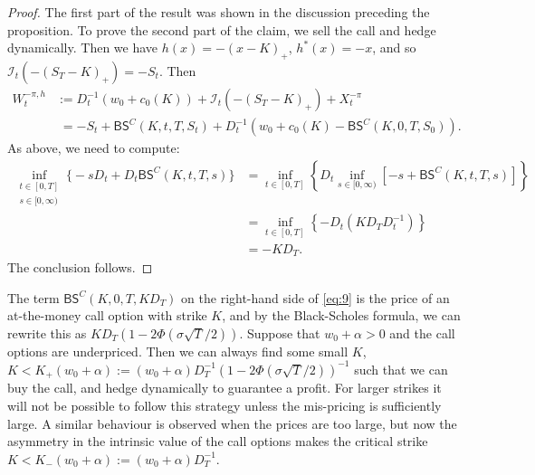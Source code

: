 \documentclass[a4paper]{amsart}
\theoremstyle{definition}
\theoremstyle{remark}
\numberwithin{equation}{section}
\newcommand{\Vc}{\mathcal{V}}
\newcommand{\In}{\mathcal{I}} %
\newcommand{\BS}{\mathsf{BS}}
\begin{document}
\begin{proof}
  The first part of the result was shown in the discussion preceding the proposition. To prove the second part of the claim, we sell the call and hedge dynamically. Then we have $h(x) = -(x-K)_+$, $h^*(x) = -x$, and so $\In_t(-(S_T-K)_+) = -S_t$. Then
  \begin{align*}
    W_t^{-\pi,h} & := D_t^{-1} (w_0+c_0(K)) + \In_t(-(S_T-K)_+) + X_t^{-\pi} \\
                & \; = -S_t + \BS^C(K,t,T,S_t) + D_t^{-1} (w_0 + c_0(K) - \BS^C(K,0,T,S_0)).
  \end{align*}
  As above, we need to compute:
  \begin{align*}
    \inf_{\substack{t \in [0,T]\\ s \in [0,\infty)}} \Big\{-sD_t +  D_t\BS^C(K,t,T,s) \Big\}
    &  = \inf_{t \in [0,T]} \left\{D_t\inf_{s \in [0,\infty)}\left[ -s + \BS^C(K,t,T,s)\right] \right\}\\
    & = \inf_{t \in [0,T]} \left\{ - D_t \left(K D_T D_t^{-1}\right)\right\}\\
    & = - K D_T.
  \end{align*}
  The conclusion follows.
\end{proof}





The term $\BS^C(K,0,T,KD_T)$ on the right-hand side of \eqref{eq:9} is the price of an at-the-money call option with strike $K$, and by the Black-Scholes formula, we can rewrite this as $K D_T \left( 1 - 2 \Phi(\sigma \sqrt{T}/2)\right)$. Suppose that  $w_0 + \alpha>0$ and the call options are underpriced. Then we can always find some small $K$, $K< K_+(w_0 + \alpha) := (w_0 + \alpha) D_T^{-1} \left( 1 - 2 \Phi(\sigma \sqrt{T}/2)\right)^{-1}$ such that we can buy the call, and hedge dynamically to guarantee a profit. For larger strikes it will not be possible to follow this strategy unless the mis-pricing is sufficiently large. A similar behaviour is observed when the prices are too large, but now the asymmetry in the intrinsic value of the call options makes the critical strike $K< K_-(w_0 + \alpha) := (w_0 + \alpha) D_T^{-1}$.
\end{document}
